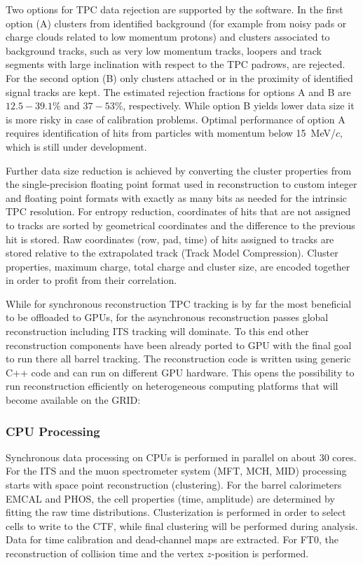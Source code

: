 Two options for TPC data rejection are supported by the software. In the first
option (A) clusters from identified background (for example from noisy pads or charge clouds
related to low momentum protons) and clusters associated to background tracks, such as very low momentum tracks, loopers and
track segments with large inclination with respect to the TPC padrows, are rejected.  For the second option (B) only clusters attached or
in the proximity of identified signal tracks are kept.
The estimated rejection fractions for options A and B are $12.5-39.1\%$ and $37-53\%$, respectively.
While option B yields lower data size it is more risky in case of calibration problems. Optimal
performance of option A requires identification of hits from particles with momentum below
15~MeV/$c$, which is still under development.

Further data size reduction is achieved by converting the cluster properties from the  single-precision floating point format used in reconstruction to custom integer and floating point formats with exactly as many bits as  needed  for the intrinsic TPC resolution. For entropy reduction, coordinates of hits that are not assigned to tracks
are sorted by geometrical coordinates and the difference to the previous
hit is stored. Raw coordinates (row, pad, time) of hits assigned to tracks
are stored relative to the extrapolated track (Track Model Compression).
Cluster properties, maximum charge, total charge and cluster size, are encoded together in order to profit from their correlation.

While for synchronous reconstruction TPC tracking is by far the most beneficial to be offloaded to GPUs, for the
asynchronous reconstruction passes global reconstruction including ITS tracking will dominate. To this
end other reconstruction components have been already ported to GPU with the final goal to run there
all barrel tracking. The reconstruction code is written using generic C++ code and can run on different
GPU hardware. This opens the possibility to run reconstruction efficiently on heterogeneous
computing platforms that will become available on the GRID:

\subsubsection{\bf CPU Processing}
Synchronous data processing on CPUs is performed in parallel on about 30 cores.
For the ITS and the muon spectrometer system (MFT, MCH, MID) processing starts with space point reconstruction
(clustering). For the barrel calorimeters EMCAL and PHOS, the cell
properties (time, amplitude) are determined by
fitting the raw time distributions. Clusterization is performed in
order to select cells to write to the CTF, while final clustering
will be performed during analysis. Data for time calibration and
dead-channel maps are extracted. For FT0, the reconstruction of
collision time and the vertex $z$-position is performed.

